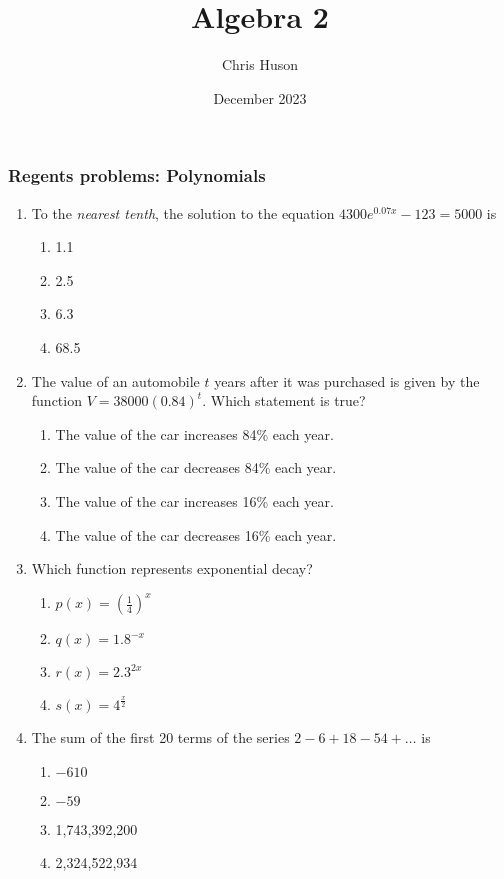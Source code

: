 \documentclass[12pt, twoside]{article}
\title{Algebra 2}
\author{Chris Huson}
\date{December 2023}
\begin{document}
\subsubsection*{Regents problems: Polynomials}
\begin{enumerate}[itemsep=0.5cm]
\item To the \emph{nearest tenth}, the solution to the equation $4300e^{0.07x} -123 = 5000$ is
\begin{enumerate}
    \item 1.1
    \item 2.5
    \item 6.3
    \item 68.5
\end{enumerate}

\item The value of an automobile $t$ years after it was purchased is given by the function $V = 38000(0.84)^t$. Which statement is true?
\begin{enumerate}
    \item The value of the car increases 84\% each year.
    \item The value of the car decreases 84\% each year.
    \item The value of the car increases 16\% each year.
    \item The value of the car decreases 16\% each year.
\end{enumerate}

\item Which function represents exponential decay?
\begin{enumerate}
    \item $\displaystyle p(x) = \left(\frac{1}{4}\right)^x$
    \item $q(x) = 1.8^{-x}$
    \item $r(x) = 2.3^{2x}$
    \item $s(x) = 4^{\frac{x}{2}}$
\end{enumerate}

\item The sum of the first 20 terms of the series \(2 - 6 + 18 - 54 + \ldots\) is
\begin{enumerate}
    \item $-610$
    \item $-59$
    \item 1,743,392,200
    \item 2,324,522,934
\end{enumerate}


\end{enumerate}
\end{document}
